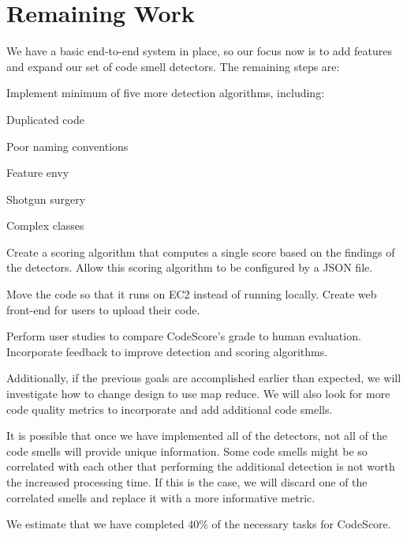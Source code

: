 \documentclass{sig-alternate}
\begin{document}
\section {Remaining Work}
We have a basic end-to-end system in place, so our focus now is to add features and expand our set of code smell detectors. The remaining steps are:
\label{sec:research_timeline}
\begin{itemize*}
	\item Implement  minimum of five more detection algorithms, including:
		\begin{itemize*}
			\item Duplicated code
			\item Poor naming conventions
			\item Feature envy 
			\item Shotgun surgery
			\item Complex classes
		\end{itemize*}
	\item Create a scoring algorithm that computes a single score based on the findings of the detectors. Allow this scoring algorithm to be configured by a JSON file. 
	\item Move the code so that it runs on EC2 instead of running locally. Create web front-end for users to upload their code.
	\item Perform user studies to compare CodeScore's grade to human evaluation. Incorporate feedback to improve detection and scoring algorithms.
\end{itemize*}
Additionally, if the previous goals are accomplished earlier than expected, we will investigate how to change design to use map reduce. We will also look for more code quality metrics to incorporate and add additional code smells. 

It is possible that once we have implemented all of the detectors, not all of
the code smells will provide unique information. Some code smells might be so correlated with each other that
performing the additional detection is not worth the increased processing time.
If this is the case, we will discard one of the correlated smells and replace it
with a more informative metric.

We estimate that we have completed 40\% of the necessary tasks for CodeScore.



\vspace{175pt}
\end{document}
